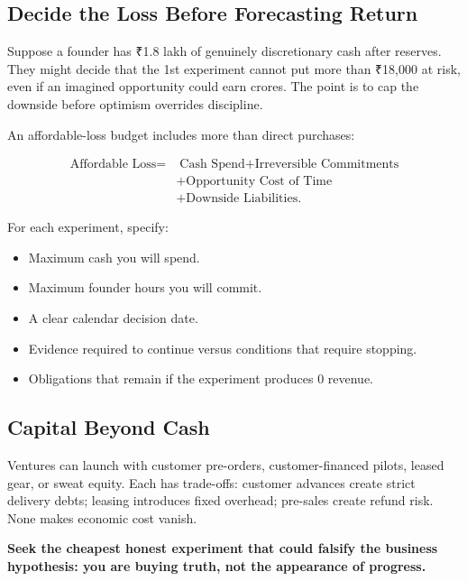 \subsection{Decide the Loss Before Forecasting Return}

Suppose a founder has ₹1.8 lakh of genuinely discretionary cash after reserves. They might decide that the 1st experiment cannot put more than ₹18,000 at risk, even if an imagined opportunity could earn crores. The point is to cap the downside before optimism overrides discipline.

An affordable-loss budget includes more than direct purchases:

\begin{equation}
\begin{split}
\text{Affordable Loss} = &\;\text{Cash Spend} + \text{Irreversible Commitments} \\
&+ \text{Opportunity Cost of Time} \\
&+ \text{Downside Liabilities}.
\end{split}
\end{equation}

For each experiment, specify:
\begin{itemize}[leftmargin=11pt,itemsep=1.5pt,topsep=1.5pt,parsep=0pt]
  \item Maximum cash you will spend.
  \item Maximum founder hours you will commit.
  \item A clear calendar decision date.
  \item Evidence required to continue versus conditions that require stopping.
  \item Obligations that remain if the experiment produces 0 revenue.
\end{itemize}

\subsection{Capital Beyond Cash}

Ventures can launch with customer pre-orders, customer-financed pilots, leased gear, or sweat equity. Each has trade-offs: customer advances create strict delivery debts; leasing introduces fixed overhead; pre-sales create refund risk. None makes economic cost vanish.

\textbf{Seek the cheapest honest experiment that could falsify the business hypothesis: you are buying truth, not the appearance of progress.}
